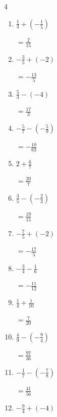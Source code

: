 \begin{multicols}{4}
\begin{enumerate}
        $\displaystyle =-\frac{4}{21}$

  \item $\displaystyle \frac{1}{3} + \left(-\frac{1}{5}\right)$

        $\displaystyle =\frac{2}{15}$

  \item $\displaystyle -\frac{3}{5} + \left(-2\right)$

        $\displaystyle =-\frac{13}{5}$

  \item $\displaystyle \frac{5}{3} - \left(-4\right)$

        $\displaystyle =\frac{17}{3}$

\columnbreak %

  \item $\displaystyle -\frac{5}{7} - \left(-\frac{5}{9}\right)$

        $\displaystyle =-\frac{10}{63}$

  \item $\displaystyle 2 + \frac{6}{7}$

        $\displaystyle =\frac{20}{7}$

  \item $\displaystyle \frac{3}{5} - \left(-\frac{2}{3}\right)$

        $\displaystyle =\frac{19}{15}$

  \item $\displaystyle -\frac{7}{5} + \left(-2\right)$

        $\displaystyle =-\frac{17}{5}$

  \item $\displaystyle -\frac{3}{4} - \frac{1}{6}$

        $\displaystyle =-\frac{11}{12}$

  \item $\displaystyle \frac{1}{4} + \frac{1}{10}$

        $\displaystyle =\frac{7}{20}$

  \item $\displaystyle \frac{4}{9} - \left(-\frac{9}{4}\right)$

        $\displaystyle =\frac{97}{36}$

  \item $\displaystyle -\frac{1}{7} - \left(-\frac{7}{8}\right)$

        $\displaystyle =\frac{41}{56}$

  \item $\displaystyle -\frac{9}{4} + \left(-4\right)$


\end{enumerate}
\end{multicols}
